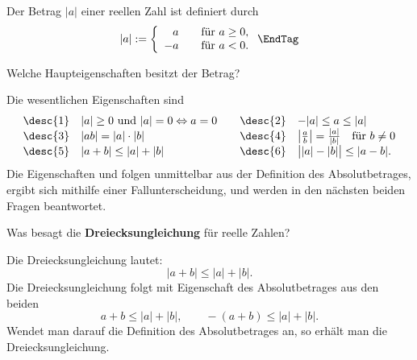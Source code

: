 \begin{antwort}
  Der Betrag $|a|$ einer reellen Zahl ist definiert durch
  \[
  |a| := \left\{ \begin{array}{rl} a \quad & \text{für $a\ge 0$}, \\
      -a \quad & \text{für $a<0$}. 
    \end{array} \right. \EndTag
  \]
\end{antwort} 


\begin{frage}\label{01_betrag_eigensch}
  Welche Haupteigenschaften besitzt der Betrag?
\end{frage}

\begin{antwort}
  Die wesentlichen Eigenschaften sind
  \[
  \begin{array}{ll@{\qquad}ll}
    \text{\desc{1}} & |a| \ge 0  \text{ und } |a|=0\Leftrightarrow a=0& 
    \text{\desc{2}} & -|a| \le a \le |a| \\
    \text{\desc{3}} & |ab| = |a|\cdot |b| & 
\text{\desc{4}} & \left|\frac{a}{b}\right| = \frac{|a|}{|b|} \quad\text{für $b\not=0$}\\
    \text{\desc{5}} & |a+b| \le |a|+|b|  &  
    \text{\desc{6}} & \big||a| - |b|\big| \le |a-b|. \\
  \end{array}
  \]
  Die Eigenschaften  und  folgen 
  unmittelbar aus der Definition des 
  Absolutbetrages, 
   ergibt sich mithilfe einer Fallunterscheidung, 
   und  werden 
  in den nächsten beiden Fragen beantwortet. \AntEnd
\end{antwort}


\begin{frage}
  \label{dreiecksungleichung}
  Was besagt die \textbf{Dreiecksungleichung}
  für reelle Zahlen?
\end{frage}

\begin{antwort}
  Die Dreiecksungleichung lautet: 
    \[
    \boxed{
      |a+b| \le |a|+|b| .
    }
    \]
\noindent%
Die Dreiecksungleichung folgt mit Eigenschaft  
  des Absolutbetrages aus den beiden  
  \[
  a+b\le |a|+|b|, \qquad -(a+b)\le |a|+|b|. 
  \] 
  Wendet man darauf die Definition des Absolutbetrages an, 
  so erhält man die Dreiecksungleichung. \AntEnd
\end{antwort}

